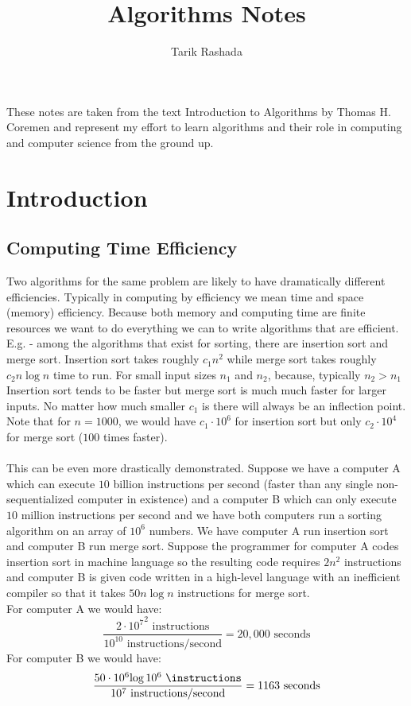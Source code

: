 \documentclass{scrartcl}
\title{Algorithms Notes}
\author{Tarik Rashada}
\theoremstyle{definition}
\theoremstyle{definition}
\theoremstyle{remark}
\numberwithin{equation}{section}
\begin{document}
\maketitle
These notes are taken from the text Introduction to Algorithms by Thomas H. Coremen and represent my effort to learn  algorithms and their role in computing and computer science from the ground up.
{\color{black}\tableofcontents}
\newpage
\section{Introduction}
\subsection{Computing Time Efficiency}
Two algorithms for the same problem are likely to have dramatically different efficiencies. Typically in computing by efficiency we mean time and space (memory) efficiency. Because both memory and computing time are finite resources we want to do everything we can to write algorithms that are efficient. E.g. - among the algorithms that exist for sorting, there are insertion sort and merge sort. Insertion sort takes roughly $c_1n^2$ while merge sort takes roughly $c_2n\log n$ time to run. For small input sizes $n_1$ and $n_2$, because, typically $n_2 > n_1$ Insertion sort tends to be faster but merge sort is much much faster for larger inputs. No matter how much smaller $c_1$ is there will always be an inflection point. Note that for $n = 1000$, we would have $c_1\cdot 10^6$ for insertion sort but only $c_2\cdot 10^4$ for merge sort ($100$ times faster). \\
\\
This can be even more drastically demonstrated. Suppose we have a computer A which can execute $10$ billion instructions per second (faster than any single non-sequentialized computer in existence) and a computer B which can only execute $10$ million instructions per second and we have both computers run a sorting algorithm on an array of $10^6$ numbers. We have computer A run insertion sort and computer B run merge sort. Suppose the programmer for computer A codes insertion sort in machine language so the resulting code requires $2n^2$ instructions and computer B is given code written in a high-level language with an inefficient compiler so that it takes $50n\log n$ instructions for merge sort. \\
For computer A we would have:
\begin{equation}
\frac{2\cdot{10^7}^2\text{ instructions}}{10^10\text{ instructions/second}} = 20,000\text{ seconds}
\end{equation}
For computer B we would have:
\begin{equation}
    \frac{50\cdot{10^6}{\log{10^6}}\text{ \instructions}}{10^7\text{ instructions/second}} = 1163\text{ seconds}
\end{equation}
\end{document}
